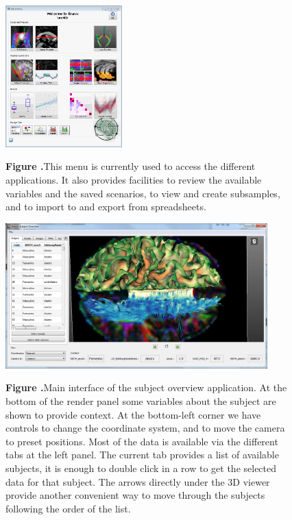 \documentclass[utf8]{frontiersSCNS} %
\begin{document}
\begin{figure}[h!]
\begin{center}
\includegraphics[width=0.4\textwidth]{figures/braviz_menu.PNG}
\end{center}
 \textbf{\label{fig_menu} Figure .}{This menu is currently used to access the different applications. It also provides facilities to review the available variables and the saved scenarios, to view and create subsamples, and to import to and export from spreadsheets.  }
\end{figure}

\begin{figure}[h!]
\begin{center}
\includegraphics[width=0.9\textwidth]{figures/subj_overview_full.PNG}
\end{center}
 \textbf{\label{fig_subject} Figure .}{Main interface of the subject overview application. At the bottom of the render panel some variables about the subject are shown to provide context. At the bottom-left corner we have controls to change the coordinate system, and to move the camera to preset positions. Most of the data is available via the different tabs at the left panel. The current tab provides a list of available subjects, it is enough to double click in a row to get the selected data for that subject. The arrows directly under the 3D viewer provide another convenient way to move through the subjects following the order of the list. }
\end{figure}
\end{document}
